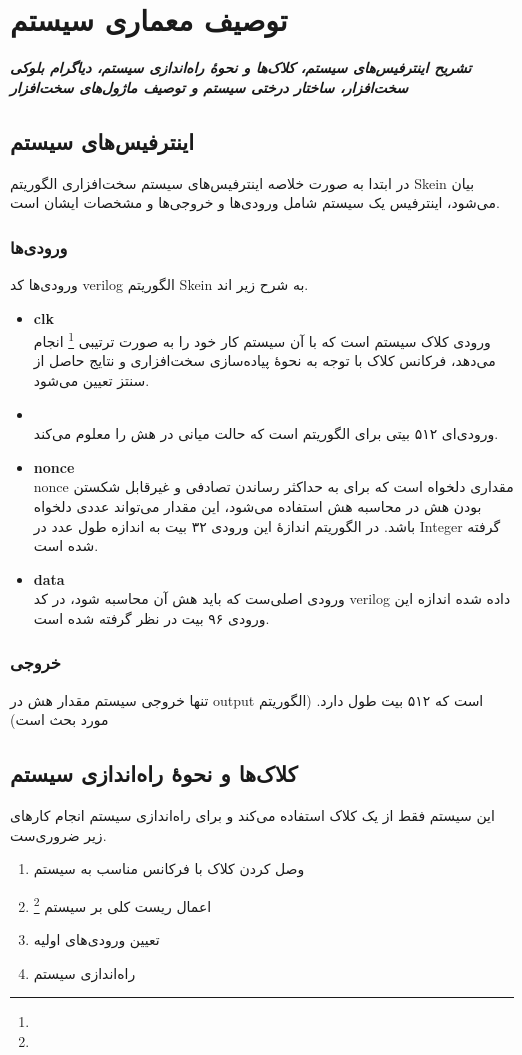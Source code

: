 \chapter{توصیف معماری سیستم}
\noindent
\textbf{
\textit{
تشریح اینترفیس‌های سیستم، کلاک‌ها و نحوهٔ راه‌اندازی سیستم، دیاگرام بلوکی سخت‌افزار، ساختار درختی سیستم و توصیف ماژول‌های سخت‌افزار 
}
}
\pagebreak

\section{ اینترفیس‌های سیستم}
در ابتدا به صورت خلاصه اینترفیس‌های سیستم سخت‌افزاری الگوریتم Skein بیان می‌شود، اینترفیس یک سیستم شامل ورودی‌ها و خروجی‌ها و مشخصات ایشان است. 
\subsection{ورودی‌ها}
ورودی‌ها کد verilog الگوریتم Skein به شرح زیر اند.
\begin{itemize}
\item
\textbf{clk}\\
ورودی کلاک سیستم است که با آن سیستم کار خود را به صورت ترتیبی 
\footnote{}
انجام می‌دهد، فرکانس کلاک با توجه به نحوهٔ پیاده‌سازی سخت‌افزاری و نتایج حاصل از سنتز تعیین می‌شود.
\item
\textbf{}\\
ورودی‌ای ۵۱۲ بیتی برای الگوریتم
  است که حالت میانی در هش را معلوم می‌کند.
\item
\textbf{nonce}\\
nonce مقداری دلخواه است که برای به حداکثر رساندن تصادفی  و غیرقابل شکستن بودن هش 
در محاسبه هش استفاده می‌شود، این مقدار می‌تواند عددی دلخواه باشد. در الگوریتم 
 اندازهٔ این ورودی ۳۲ بیت به اندازه طول عدد در Integer گرفته شده است.
\item
\textbf{data}\\
ورودی اصلی‌ست که باید هش آن محاسبه شود، در کد verilog داده شده اندازه این ورودی ۹۶ بیت در نظر گرفته شده است. 
\end{itemize}

\subsection{خروجی}
تنها خروجی سیستم مقدار هش در output است که ۵۱۲ بیت طول دارد.
(الگوریتم مورد بحث 
 است)

\section{کلاک‌ها و نحوهٔ راه‌اندازی سیستم}
این سیستم فقط از یک کلاک استفاده می‌کند و برای راه‌اندازی سیستم انجام کارهای زیر ضروری‌ست.
\begin{enumerate}
\item
وصل کردن کلاک با فرکانس مناسب به سیستم
\item
اعمال ریست‌ کلی بر سیستم
\footnote{}
\item 
تعیین ورودی‌های اولیه 
\item 
راه‌اندازی سیستم 
\end{enumerate}


